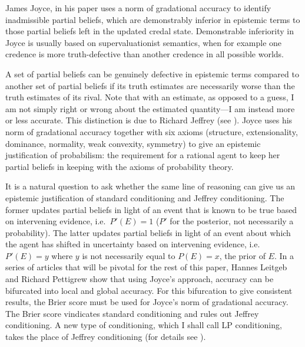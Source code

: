 \documentclass[12pt]{article}
\begin{document}
James Joyce, in his paper  uses a norm of gradational accuracy to identify
inadmissible partial beliefs, which are demonstrably inferior in
epistemic terms to those partial beliefs left in the updated credal
state. Demonstrable inferiority in Joyce is usually based on
supervaluationist semantics, when for example one credence is more
truth-defective than another credence in all possible worlds.

A set of partial beliefs can be genuinely defective in epistemic terms
compared to another set of partial beliefs if its truth estimates are
necessarily worse than the truth estimates of its rival. Note that
with an estimate, as opposed to a guess, I am not simply right or
wrong about the estimated quantity---I am instead more or less
accurate. This distinction is due to Richard Jeffrey (see
). Joyce uses his norm of gradational accuracy
together with six axioms (structure, extensionality, dominance,
normality, weak convexity, symmetry) to give an epistemic
justification of probabilism: the requirement for a rational agent to
keep her partial beliefs in keeping with the axioms of probability
theory.

It is a natural question to ask whether the same line of reasoning can
give us an epistemic justification of standard conditioning and
Jeffrey conditioning. The former updates partial beliefs in light of
an event that is known to be true based on intervening evidence, i.e.\
$P'(E)=1$ ($P'$ for the posterior, not necessarily a probability). The
latter updates partial beliefs in light of an event about which the
agent has shifted in uncertainty based on intervening evidence, i.e.\
$P'(E)=y$ where $y$ is not necessarily equal to $P(E)=x$, the prior of
$E$. In a series of articles that will be pivotal for the rest of this
paper, Hannes Leitgeb and Richard Pettigrew show that using Joyce's
approach, accuracy can be bifurcated into local and global accuracy.
For this bifurcation to give consistent results, the Brier score must
be used for Joyce's norm of gradational accuracy. The Brier score
vindicates standard conditioning and rules out Jeffrey conditioning. A
new type of conditioning, which I shall call LP conditioning, takes
the place of Jeffrey conditioning (for details see
\scite{7}{leitgebpettigrew10i}{}).
\end{document}

